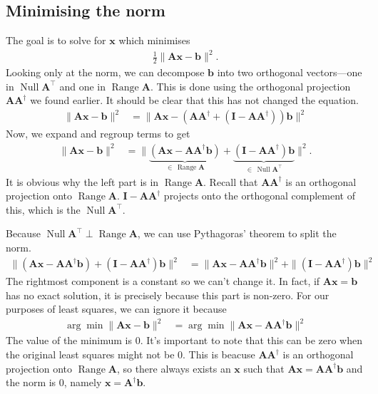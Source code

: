 \documentclass[12pt,a4paper]{article} %
\DeclareMathOperator{\Range}{Range}
\DeclareMathOperator{\Null}{Null}
\begin{document}
\newpage
\subsection{Minimising the norm}
The goal is to solve for $\bm x$ which minimises
\begin{align*}
    \frac{1}{2}\| \mathbf A \bm x - \bm b \| ^2.
\end{align*}
Looking only at the norm, we can decompose $\bm b$ into two orthogonal vectors---one in $\Null \mathbf A^\top$ and one 
in $\Range \mathbf A$. This is done using the orthogonal projection $\mathbf A\mathbf A^\dagger$ we found earlier. 
It should be clear that this has not changed the equation. 
\begin{align*}
    \| \mathbf A \bm x - \bm b \| ^2 &= \| \mathbf A \bm x - (\mathbf A \mathbf A^\dagger + (\mathbf I - \mathbf A\mathbf A^\dagger))\bm b \|^2
\end{align*}
Now, we expand and regroup terms to get 
\begin{align*}
    \| \mathbf A \bm x - \bm b \| ^2 &= \| \underbrace{(\mathbf A \bm x - \mathbf A \mathbf A^\dagger \bm b)}_{\in \,\Range \mathbf A} + \underbrace{(\mathbf I - \mathbf A\mathbf A^\dagger)\bm b}_{\in \, \Null \mathbf A^\top} \|^2.
\end{align*}
It is obvious why the left part is in $\Range \mathbf A$. Recall that $\mathbf A \mathbf A^\dagger$ is an orthogonal projection onto $\Range \mathbf A$.
$\mathbf I - \mathbf A \mathbf A^\dagger$ projects onto the orthogonal complement of this, which is the $\Null \mathbf A^\top$.

Because $\Null \mathbf A^\top \perp \Range \mathbf A$, we can use Pythagoras' theorem to split the norm.
\begin{align*}
    \| {(\mathbf A \bm x - \mathbf A \mathbf A^\dagger \bm b)} + {(\mathbf I - \mathbf A\mathbf A^\dagger)\bm b} \|^2
    &= \| {\mathbf A \bm x - \mathbf A \mathbf A^\dagger \bm b} \| ^2 + \| {(\mathbf I - \mathbf A\mathbf A^\dagger)\bm b}  \| ^2
\end{align*}
The rightmost component is a constant so we can't change it. In fact, if $\mathbf A \bm x = \bm b$ has no exact solution, 
it is precisely because this part is non-zero. For our purposes of least squares, we can ignore it because 
\begin{align*}
    \arg\min \| \mathbf A \bm x - \bm b \| ^2 &= \arg \min \| {\mathbf A \bm x - \mathbf A \mathbf A^\dagger \bm b} \| ^2
\end{align*}
The value of the minimum is 0. It's important to note that this can be zero when 
the original least squares might not be 0. This is beacuse $\mathbf A \mathbf A^\dagger$ is an orthogonal projection onto 
$\Range \mathbf A$, so there always exists  an $\bm x$ such that $\mathbf A \bm x = \mathbf A \mathbf A^\dagger \bm b$ and the 
norm is 0, namely $\bm x = \mathbf A^\dagger \bm b$.
\end{document}
